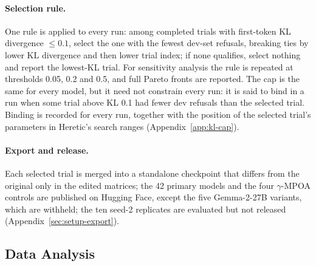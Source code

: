 \paragraph{Selection rule.} One rule is applied to every run: among completed trials
with first-token KL divergence $\le 0.1$, select the one with the fewest dev-set refusals, breaking ties by
lower KL divergence and then lower trial index; if none qualifies, select
nothing and report the lowest-KL trial. For sensitivity analysis the rule is repeated at thresholds 0.05,
0.2 and 0.5, and full Pareto fronts are reported. The cap is the same for
every model, but it need not constrain every run: it is said to bind in a run
when some trial above KL 0.1 had fewer dev refusals than the selected trial.
Binding is recorded for every run, together with the position of the selected
trial's parameters in Heretic's search ranges (Appendix~\ref{app:kl-cap}).

\paragraph{Export and release.} Each selected trial is merged into a
standalone checkpoint that differs from the original only in the edited
matrices; the 42 primary models and the four $\gamma$-MPOA controls are
published on Hugging Face, except the five Gemma-2-27B variants, which are
withheld; the ten seed-2 replicates are evaluated but not
released (Appendix~\ref{sec:setup-export}).

\subsection{Data Analysis}
\label{sec:setup-stats}

